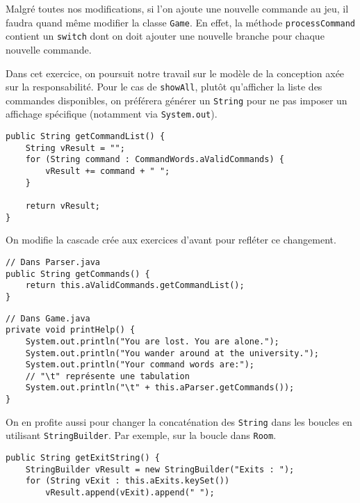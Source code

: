 \begin{exercise}[subtitle=Changer Game ?]

Malgré toutes nos modifications, si l'on ajoute une nouvelle commande au jeu, il faudra quand même modifier la classe \verb|Game|. En effet, la méthode \verb|processCommand| contient un \verb|switch| dont on doit ajouter une nouvelle branche pour chaque nouvelle commande.

\end{exercise}

\begin{exercise}[subtitle=getCommandList]

Dans cet exercice, on poursuit notre travail sur le modèle de la conception axée sur la responsabilité. Pour le cas de \verb|showAll|, plutôt qu'afficher la liste des commandes disponibles, on préférera générer un \verb|String| pour ne pas imposer un affichage spécifique (notamment via \verb|System.out|).

\begin{verbatim}
public String getCommandList() {
    String vResult = "";
    for (String command : CommandWords.aValidCommands) {
        vResult += command + " ";
    }

    return vResult;
}
\end{verbatim}

On modifie la cascade crée aux exercices d'avant pour refléter ce changement.

\begin{verbatim}
// Dans Parser.java
public String getCommands() {
    return this.aValidCommands.getCommandList();
}
\end{verbatim}

\begin{verbatim}
// Dans Game.java
private void printHelp() {
    System.out.println("You are lost. You are alone.");
    System.out.println("You wander around at the university.");
    System.out.println("Your command words are:");
    // "\t" représente une tabulation
    System.out.println("\t" + this.aParser.getCommands());
}
\end{verbatim}

On en profite aussi pour changer la concaténation des \verb|String| dans les boucles en utilisant \verb|StringBuilder|. Par exemple, sur la boucle dans \verb|Room|.

\begin{verbatim}
public String getExitString() {
    StringBuilder vResult = new StringBuilder("Exits : ");
    for (String vExit : this.aExits.keySet())
        vResult.append(vExit).append(" ");


\end{verbatim}
\end{exercise}
